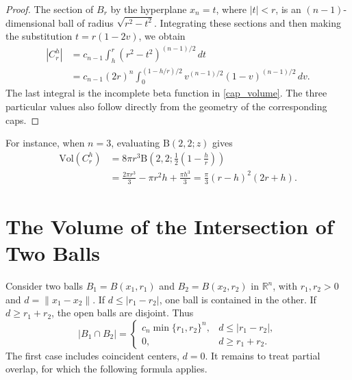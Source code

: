 \documentclass[12pt]{amsart}
\numberwithin{equation}{section}
\begin{document}
\begin{proof}
The section of $B_r$ by the hyperplane $x_n=t$, where $|t|<r$,
is an $(n-1)$-dimensional ball of radius $\sqrt{r^2-t^2}$.
Integrating these sections and then making the substitution
$t=r(1-2v)$, we obtain
\[
\begin{aligned}
|C_r^h|
&=c_{n-1}\int_h^r(r^2-t^2)^{(n-1)/2}\,dt\\
&=c_{n-1}(2r)^n
  \int_0^{(1-h/r)/2}v^{(n-1)/2}(1-v)^{(n-1)/2}\,dv.
\end{aligned}
\]
The last integral is the incomplete beta function in
\eqref{cap_volume}. The three particular values also follow directly
from the geometry of the corresponding caps.
\end{proof}

For instance, when $n=3$, evaluating $\mathrm{B}(2,2;z)$ gives
\begin{equation}
\label{cap_volume_three}
\begin{aligned}
\mathrm{Vol}(C_r^h)
&=8\pi r^3\mathrm{B}\!\left(2,2;\frac12\left(1-\frac hr\right)\right)\\
&=\frac{2\pi r^3}{3}-\pi r^2h+\frac{\pi h^3}{3}
 =\frac{\pi}{3}(r-h)^2(2r+h).
\end{aligned}
\end{equation}
\FloatBarrier

\section{The Volume of the Intersection of Two Balls}

Consider two balls $B_1=B(x_1,r_1)$ and $B_2=B(x_2,r_2)$ in
$\mathbb{R}^n$, with $r_1,r_2>0$ and $d=\|x_1-x_2\|$.
If $d\leq|r_1-r_2|$, one ball is contained in the other. If
$d\geq r_1+r_2$, the open balls are disjoint. Thus
\[
|B_1\cap B_2|=
\begin{cases}
c_n\min\{r_1,r_2\}^n,&d\leq|r_1-r_2|,\\[2pt]
0,&d\geq r_1+r_2.
\end{cases}
\]
The first case includes coincident centers, $d=0$. It remains to treat
partial overlap, for which the following formula applies.
\end{document}
